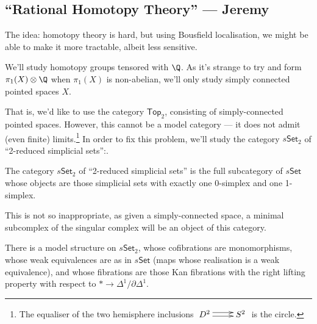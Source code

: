 \documentclass[11pt]{article}
\newcommand{\KanSemResponse}[1]
{
\thispagestyle{fancy}
\subsection*{#1}
}
\begin{document}
\begin{JeremyRationalHomotopyPractice}
\KanSemResponse
{``Rational Homotopy Theory'' --- Jeremy}
The idea: homotopy theory is hard, but using Bousfield localisation, we might be able to make it more tractable, albeit less sensitive.

We'll study homotopy groups tensored with $\Q$. As it's strange to try and form $\pi_1(X)\otimes\Q$ when $\pi_1(X)$ is non-abelian, we'll only study simply connected pointed spaces $X$.

That is, we'd like to use the category $\mathsf{Top}_2$, consisting of simply-connected pointed spaces. However, this cannot be a model category --- it does not admit (even finite) limits.\footnote{The equaliser of the two hemisphere inclusions $\xymatrix{D^2\ar@<1mm>[r]\ar@<-.5mm>[r]&S^2}$ is the circle.}
In order to fix this problem, we'll study the category $s\mathsf{Set}_2$ of ``2-reduced simplicial sets'':. 
\begin{defn*}
The category $s\mathsf{Set}_2$ of ``2-reduced simplicial sets'' is the full subcategory of $s\mathsf{Set}$ whose objects are those simplicial sets with exactly one 0-simplex and one 1-simplex.
\end{defn*}
\noindent This is not so inappropriate, as given a simply-connected space, a minimal subcomplex of the singular complex will be an object of this category.
\begin{prop*}
There is a model structure on $s\mathsf{Set}_2$, whose cofibrations are monomorphisms, whose weak equivalences are as in $s\mathsf{Set}$ (maps whose realisation is a weak equivalence), and whose fibrations are those Kan fibrations with the right lifting property with respect to $*\to\Delta^1/\partial\Delta^1$. 
\end{prop*}

\end{JeremyRationalHomotopyPractice}
\end{document}
